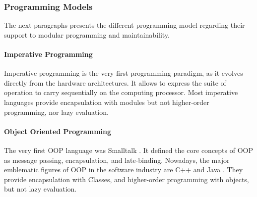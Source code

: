 \subsubsection{Programming Models} \label{chapter3:software-maintainability:modularity:programming-models}

The next paragraphs presents the different programming model regarding their support to modular programming and maintainability.

\paragraph{Imperative Programming}

Imperative programming is the very first programming paradigm, as it evolves directly from the hardware architectures.
It allows to express the suite of operation to carry sequentially on the computing processor.
Most imperative languages provide encapsulation with modules but not higher-order programming, nor lazy evaluation.

\paragraph{Object Oriented Programming}



The very first OOP language was Smalltalk \cite{Goldberg1984}.
It defined the core concepts of OOP as message passing, encapsulation, and late-binding.
Nowadays, the major emblematic figures of OOP in the software industry are C++ and Java \cite{Gosling2000,Stroustrup1986}.
They provide encapsulation with Classes, and higher-order programming with objects, but not lazy evaluation.

